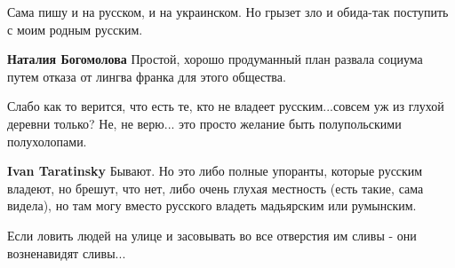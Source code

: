 \begin{itemize}
 
Сама пишу и на русском, и на украинском. Но грызет зло и обида-так поступить с моим родным русским.

\begin{itemize}
 
\textbf{Наталия Богомолова} Простой, хорошо продуманный план развала социума путем отказа от лингва франка для этого общества.
\end{itemize}

 

Слабо как то верится, что есть те, кто не владеет русским...совсем уж из глухой
деревни только? Не, не верю... это просто желание быть полупольскими
полухолопами.

\begin{itemize}
 
\textbf{Ivan Taratinsky} Бывают. Но это либо полные упоранты, которые русским владеют, но брешут, что нет, либо очень глухая местность (есть такие, сама видела), но там могу вместо русского владеть мадьярским или румынским.
\end{itemize}

 

Если ловить людей на улице и засовывать во все отверстия им сливы - они
возненавидят сливы...


\end{itemize}
